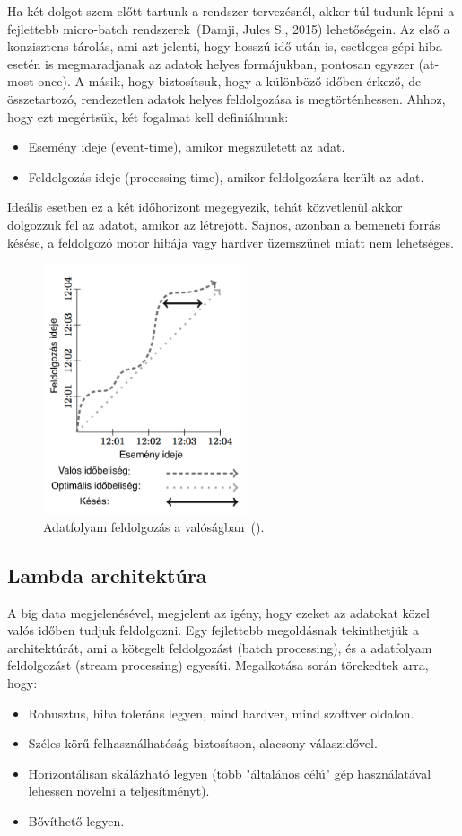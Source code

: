 \documentclass[a4paper,12pt]{article}
\begin{document}
Ha két dolgot szem előtt tartunk a rendszer tervezésnél, akkor túl tudunk lépni a fejlettebb micro-batch rendszerek~(Damji, Jules S., 2015) lehetőségein. Az első a konzisztens tárolás, ami azt jelenti, hogy hosszú idő után is, esetleges gépi hiba esetén is megmaradjanak az adatok helyes formájukban, pontosan egyszer (at-most-once). A másik, hogy biztosítsuk, hogy a különböző időben érkező, de összetartozó, rendezetlen adatok helyes feldolgozása is megtörténhessen. Ahhoz, hogy ezt megértsük, két fogalmat kell definiálnunk:
\begin{itemize}
\item Esemény ideje (event-time), amikor megszületett az adat.
\item Feldolgozás ideje (processing-time), amikor feldolgozásra került az adat.
\end{itemize}
Ideális esetben ez a két időhorizont megegyezik, tehát közvetlenül akkor dolgozzuk fel az adatot, amikor az létrejött. Sajnos, azonban a bemeneti forrás késése, a feldolgozó motor hibája vagy hardver üzemszünet miatt nem lehetséges. 
 
\begin{figure}[H]
\centering
\includegraphics[width=60mm]{img/skew.png}
\caption{Adatfolyam feldolgozás a valóságban~(\cite{skew}). \label{skew}} 
\end{figure}

\subsection{Lambda architektúra}
A big data megjelenésével, megjelent az igény, hogy ezeket az adatokat közel valós időben tudjuk feldolgozni. Egy fejlettebb megoldásnak tekinthetjük a architektúrát, ami a kötegelt feldolgozást (batch processing), és a adatfolyam feldolgozást (stream processing) egyesíti. Megalkotása során törekedtek arra, hogy:
\begin{itemize}
\item Robusztus, hiba toleráns legyen, mind hardver, mind szoftver oldalon.
\item Széles körű felhasználhatóság biztosítson, alacsony válaszidővel.
\item Horizontálisan skálázható legyen (több "általános célú" gép használatával lehessen növelni a teljesítményt).
\item Bővíthető legyen.
\end{itemize}
\end{document}
